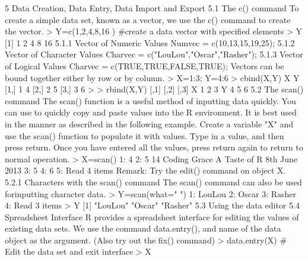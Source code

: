5 Data Creation, Data Entry, Data Import and Export
5.1 The c() command
To create a simple data set, known as a vector, we use the c() command to create the vector.
> Y=c(1,2,4,8,16 ) #create a data vector with specified elements
> Y
[1] 1 2 4 8 16
5.1.1 Vector of Numeric Values
Numvec = c(10,13,15,19,25);
5.1.2 Vector of Character Values
Charvec = c("LouLou","Oscar","Rasher");
5.1.3 Vector of Logical Values
Charvec = c(TRUE,TRUE,FALSE,TRUE);
Vectors can be bound together either by row or by column.
> X=1:3; Y=4:6
> cbind(X,Y)
X Y
[1,] 1 4
[2,] 2 5
[3,] 3 6
>
> rbind(X,Y)
[,1] [,2] [,3]
X 1 2 3
Y 4 5 6
5.2 The scan() command
The scan() function is a useful method of inputting data quickly. You can use to quickly copy
and paste values into the R environment. It is best used in the manner as described in the
following example. Create a variable "X" and use the scan() function to populate it with
values. Type in a value, and then press return. Once you have entered all the values, press
return again to return to normal operation.
> X=scan()
1: 4
2: 5
14
Coding Grace A Taste of R 8th June 2013
3: 5
4: 6
5:
Read 4 items
Remark: Try the edit() command on object X.
5.2.1 Characters with the scan() command
The scan() command can also be used forinputting character data.
> Y=scan(what=" ")
1: LouLou
2: Oscar
3: Rasher
4:
Read 3 items
> Y
[1] "LouLou" "Oscar" "Rasher"
5.3 Using the data editor
5.4 Spreadsheet Interface
R provides a spreadsheet interface for editing the values of existing data sets. We use the
command data.entry(), and name of the data object as the argument. (Also try out the
fix() command)
> data.entry(X) # Edit the data set and exit interface
> X

